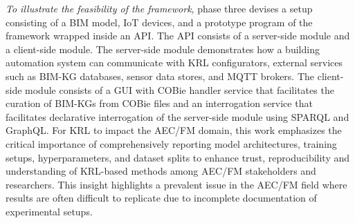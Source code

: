 \textit{To illustrate the feasibility of the framework}, phase three devises a setup consisting of a \ac{BIM} model, \ac{IoT} devices, and a prototype program of the framework wrapped inside an \ac{API}. The \ac{API} consists of a server-side module and a client-side module. The server-side module demonstrates how a building automation system can communicate with \ac{KRL} configurators, external services such as \ac{BIM-KG} databases, sensor data stores, and \ac{MQTT} brokers. The client-side module consists of a \ac{GUI} with \ac{COBie} handler service that facilitates the curation of \acp{BIM-KG} from \ac{COBie} files and an interrogation service that facilitates declarative interrogation of the server-side module using \ac{SPARQL} and \ac{GraphQL}. For \ac{KRL} to impact the \ac{AEC/FM} domain, this work emphasizes the critical importance of comprehensively reporting model architectures, training setups, hyperparameters, and dataset splits to enhance trust, reproducibility and understanding of \ac{KRL}-based methods among \ac{AEC/FM} stakeholders and researchers. This insight highlights a prevalent issue in the \ac{AEC/FM} field where results are often difficult to replicate due to incomplete documentation of experimental setups.


